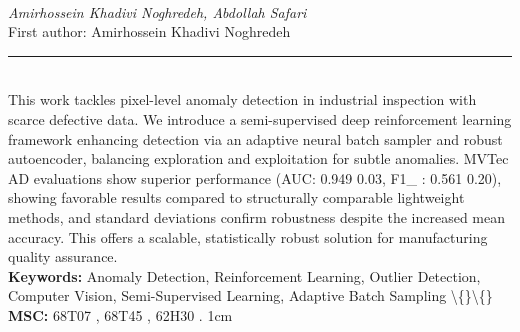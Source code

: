 \documentclass[10pt,twoside]{article}
\begin{document}
\noindent\begin{minipage}[t][\textheight]{\textwidth}
\\[0.35em]
{\itshape Amirhossein Khadivi Noghredeh, Abdollah Safari}\\[0.2em]
{\footnotesize First author: Amirhossein Khadivi Noghredeh}\\[0.45em]
\noindent\rule{\textwidth}{0.3pt}\\[0.4em]
{\footnotesize  This work tackles pixel-level anomaly detection in industrial inspection with scarce defective data. We introduce a semi-supervised deep reinforcement learning framework enhancing detection via an adaptive neural batch sampler and robust autoencoder, balancing exploration and exploitation for subtle anomalies. MVTec AD evaluations show superior performance (AUC: 0.949 0.03, F1\_ : 0.561 0.20), showing favorable results compared to structurally comparable lightweight methods, and standard deviations confirm robustness despite the increased mean accuracy. This offers a scalable, statistically robust solution for manufacturing quality assurance.}\\[0.4em]
{\footnotesize\bfseries Keywords:} {\footnotesize Anomaly Detection, Reinforcement Learning, Outlier Detection, Computer Vision, Semi-Supervised Learning, Adaptive Batch Sampling \textbackslash\{\}\textbackslash\{\}}\\[0.15em]
{\footnotesize\bfseries MSC:} {\footnotesize 68T07 , 68T45 , 62H30 . 1cm}\\
\vfill
\end{minipage}
\newpage
\end{document}

